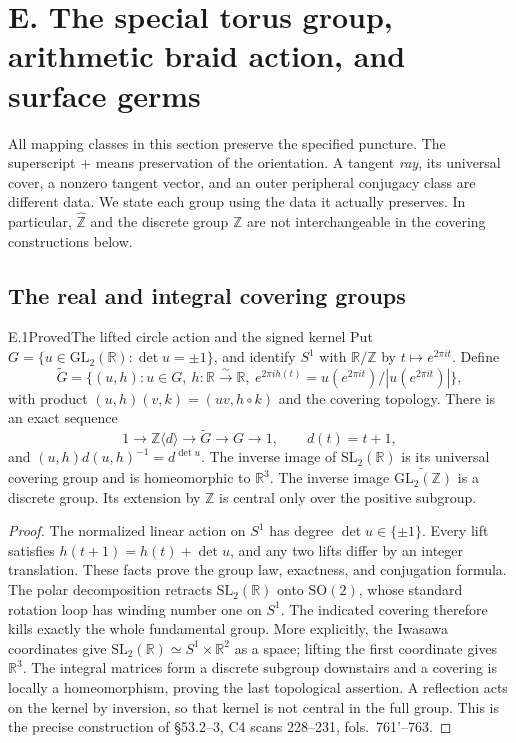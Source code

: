 \section{E. The special torus group, arithmetic braid action, and surface germs}
\label{sec:E}

All mapping classes in this section preserve the specified puncture.
The superscript $+$ means preservation of the orientation.  A tangent
\emph{ray}, its universal cover, a nonzero tangent vector, and an outer
peripheral conjugacy class are different data.  We state each group
using the data it actually preserves.  In particular, $\widehat{\mathbb Z}$
and the discrete group $\mathbb Z$ are not interchangeable in the
covering constructions below.

\subsection{The real and integral covering groups}

\begin{statement}{E.1}{Proved}{The lifted circle action and the signed kernel}
Put $G=\{u\in\mathrm{GL}_2(\mathbb R):\det u=\pm1\}$, and identify
$S^1$ with $\mathbb R/\mathbb Z$ by $t\mapsto e^{2\pi it}$.  Define
\[
 \widetilde G=\{(u,h):u\in G,\ h:\mathbb R\xrightarrow{\sim}\mathbb R,
 \ e^{2\pi i h(t)}=u(e^{2\pi it})/|u(e^{2\pi it})|\},
\]
with product $(u,h)(v,k)=(uv,h\circ k)$ and the covering topology.
There is an exact sequence
\[
 1\longrightarrow\mathbb Z\langle d\rangle\longrightarrow
 \widetilde G\longrightarrow G\longrightarrow1,
 \qquad d(t)=t+1,
\]
and $(u,h)d(u,h)^{-1}=d^{\det u}$.  The inverse image of
$\mathrm{SL}_2(\mathbb R)$ is its universal covering group and is
homeomorphic to $\mathbb R^3$.  The inverse image
$\widetilde{\mathrm{GL}_2(\mathbb Z)}$ is a discrete group.  Its
extension by $\mathbb Z$ is central only over the positive subgroup.
\end{statement}
\begin{proof}
The normalized linear action on $S^1$ has degree $\det u\in\{\pm1\}$.
Every lift satisfies $h(t+1)=h(t)+\det u$, and any two lifts differ
by an integer translation.  These facts prove the group law, exactness,
and conjugation formula.  The polar decomposition retracts
$\mathrm{SL}_2(\mathbb R)$ onto $\mathrm{SO}(2)$, whose standard
rotation loop has winding number one on $S^1$.  The indicated covering
therefore kills exactly the whole fundamental group.  More explicitly,
the Iwasawa coordinates give
$\mathrm{SL}_2(\mathbb R)\simeq S^1\times\mathbb R^2$ as a space;
lifting the first coordinate gives $\mathbb R^3$.
The integral matrices form a discrete subgroup downstairs and a
covering is locally a homeomorphism, proving the last topological
assertion.  A reflection acts on the kernel by inversion, so that
kernel is not central in the full group.  This is the precise
construction of \S53.2--3, C4 scans 228--231, fols.~761'--763.
\end{proof}

